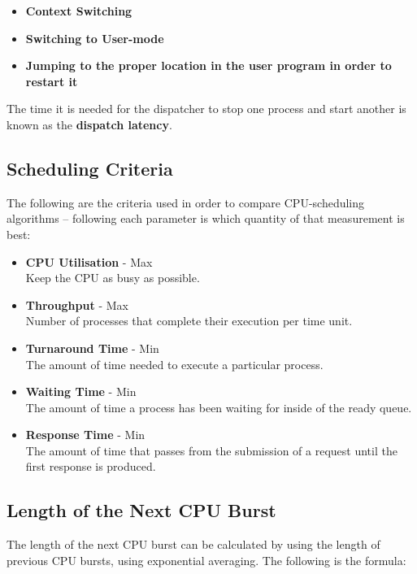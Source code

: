 \documentclass{article}
\begin{document}
\begin{itemize}
	\item \textbf{Context Switching}
	\item \textbf{Switching to User-mode}
	\item \textbf{Jumping to the proper location in the user program in order to restart it}
\end{itemize}
The time it is needed for the dispatcher to stop one process and start another is known as the \textbf{dispatch latency}.

\subsection{Scheduling Criteria}
The following are the criteria used in order to compare CPU-scheduling algorithms -- following each parameter is which quantity of that measurement is best:

\begin{itemize}
	\item \textbf{CPU Utilisation} - Max
	\vspace{.2cm} \\
	Keep the CPU as busy as possible.
	
	\item \textbf{Throughput} - Max
	\vspace{.2cm} \\
	Number of processes that complete their execution per time unit.
	
	\item \textbf{Turnaround Time} - Min
	\vspace{.2cm} \\
	The amount of time needed to execute a particular process.
	
	\item \textbf{Waiting Time} - Min
	\vspace{.2cm} \\
	The amount of time a process has been waiting for inside of the ready queue.
	
	\item \textbf{Response Time} - Min
	\vspace{.2cm} \\
	The amount of time that passes from the submission of a request until the first response is produced.
\end{itemize}

\subsection{Length of the Next CPU Burst}
The length of the next CPU burst can be calculated by using the length of previous CPU bursts, using exponential averaging. The following is the formula: \
\end{document}
